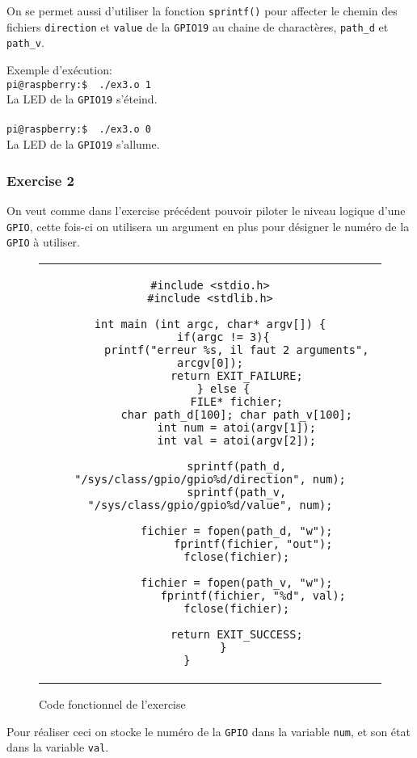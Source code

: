 \documentclass[11pt, openright]{book}
\begin{document}
On se permet aussi d'utiliser la fonction \texttt{sprintf()} pour affecter le chemin des fichiers \texttt{direction} et \texttt{value} de la \texttt{GPIO19} au chaine de charactères, \texttt{path\_d} et \texttt{path\_v}.

Exemple d'exécution:\\
\texttt{pi@raspberry:\text{$\sim$}\$ \ ./ex3.o 1}\\
La LED de la \texttt{GPIO19} s'éteind.\\
\\
\texttt{pi@raspberry:\text{$\sim$}\$ \ ./ex3.o 0}\\
La LED de la \texttt{GPIO19} s'allume.

\subsubsection{Exercise 2}

On veut comme dans l'exercise précédent pouvoir piloter le niveau logique d'une \texttt{GPIO}, cette fois-ci on utilisera un argument en plus pour désigner le numéro de la \texttt{GPIO} à utiliser.

\begin{figure}[ht!]
	\centering
	\begin{tabular}{c}
		\begin{lstlisting}
#include <stdio.h>
#include <stdlib.h>

int main (int argc, char* argv[]) {
    if(argc != 3){
        printf("erreur %s, il faut 2 arguments", arcgv[0]);
        return EXIT_FAILURE;
    } else {
        FILE* fichier;
        char path_d[100]; char path_v[100];
        int num = atoi(argv[1]);
		int val = atoi(argv[2]);

        sprintf(path_d, "/sys/class/gpio/gpio%d/direction", num);
        sprintf(path_v, "/sys/class/gpio/gpio%d/value", num);

        fichier = fopen(path_d, "w");
             fprintf(fichier, "out");
        fclose(fichier);

		fichier = fopen(path_v, "w");
             fprintf(fichier, "%d", val);
        fclose(fichier);

        return EXIT_SUCCESS;
    }
}		\end{lstlisting}
	\end{tabular}
	\caption{Code fonctionnel de l'exercise }
\end{figure}

Pour réaliser ceci on stocke le numéro de la \texttt{GPIO} dans la variable \texttt{num}, et son état dans la variable \texttt{val}.
\end{document}
